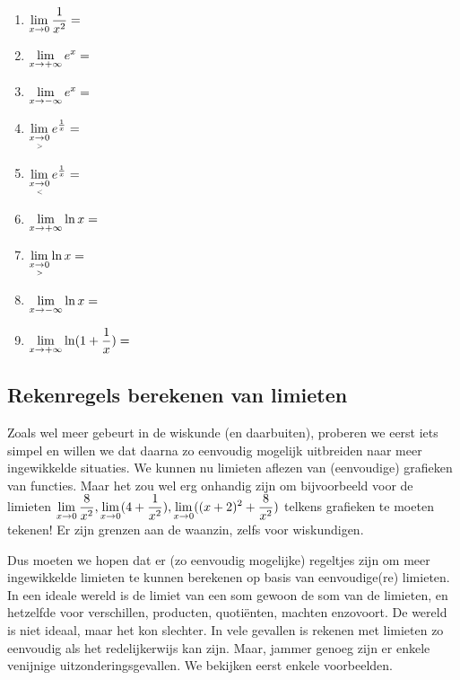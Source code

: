 \documentclass[numbers]{ximera}
\begin{document}
\begin{exercise}
	\begin{enumerate}
		\item $\limx    \frac{1}{x^2}=\;$\let\i\localoefoptions
		\item $\limxi   e^x = \;$        \localoefoptions
		\item $\limxmi  e^x = \;$        \localoefoptions
		\item $\rlimx   e^{\frac 1x} = $
		\item $\llimx   e^{\frac 1x} = $
		\item $\limxi   \ln x = $
		\item $\rlimx   \ln x = $
		\item $\limxmi  \ln x = $
		\item $\limxi   \ln(1+ \frac 1x) = $
	\end{enumerate}
\end{exercise}


\subsection{Rekenregels berekenen van limieten}

Zoals wel meer gebeurt in de wiskunde (en daarbuiten), proberen we eerst iets simpel en willen we dat daarna zo eenvoudig mogelijk uitbreiden naar meer ingewikkelde situaties. We kunnen nu limieten aflezen van (eenvoudige) grafieken van functies. Maar het zou wel erg onhandig zijn om bijvoorbeeld voor de limieten $\limx \frac{8}{x^2}, \limx (4+\frac{1}{x^2}), \limx ((x+2)^2 + \frac{8}{x^2})$ telkens grafieken te moeten tekenen! Er zijn grenzen aan de waanzin, zelfs voor wiskundigen.

Dus moeten we hopen dat er (zo eenvoudig mogelijke) regeltjes zijn om meer ingewikkelde limieten te kunnen berekenen op basis van eenvoudige(re) limieten. In een ideale wereld is de limiet van een som gewoon de som van de limieten, en hetzelfde voor verschillen, producten, quotiënten, machten enzovoort. De wereld is niet ideaal, maar het kon slechter. In vele gevallen is rekenen met limieten  zo eenvoudig als het redelijkerwijs kan zijn. Maar, jammer genoeg zijn er enkele venijnige uitzonderingsgevallen. We bekijken eerst enkele voorbeelden.
\end{document}
